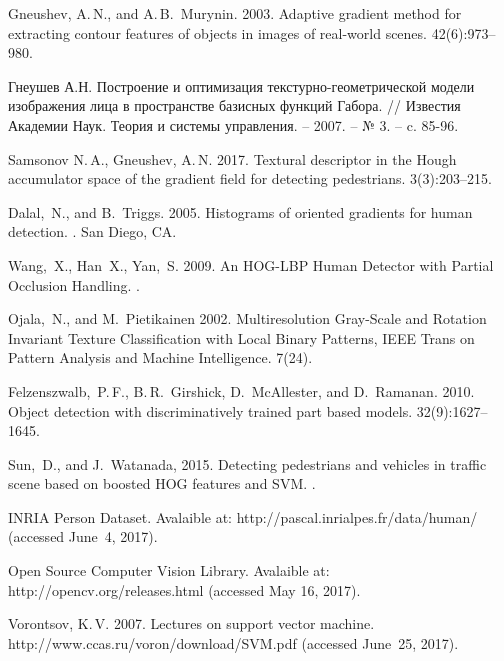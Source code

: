 \documentclass[12pt,twoside]{article}
\begin{document}
\begin{thebibliography}{99}
Gneushev, A.\,N., and A.\,B.~Murynin.	
2003. Adaptive gradient method for extracting contour features of
objects in images of real-world scenes.
 42(6):973--980.

Гнеушев А.Н. Построение и оптимизация текстурно-геометрической модели изображения лица в пространстве базисных функций Габора. // Известия Академии Наук. Теория и системы управления. – 2007. – № 3. – c. 85-96.

Samsonov N.\,A., Gneushev, A.\,N.	
2017. Textural descriptor in the Hough accumulator space of the gradient field for detecting pedestrians.
 3(3):203--215.

Dalal,~N., and B.~Triggs. 2005.
 Histograms of oriented gradients for
human detection. . San Diego, CA.

Wang,~X., Han~X., Yan,~S. 2009.
 An HOG-LBP Human Detector with Partial Occlusion Handling. .

Ojala,~N., and M.~Pietikainen 2002.
 Multiresolution Gray-Scale and Rotation Invariant Texture Classification with Local Binary Patterns, IEEE Trans on Pattern Analysis and Machine Intelligence.
 7(24).
 
	{Felzenszwalb,~P.\,F., B.\,R.~Girshick, D.~McAllester,
	and D.~Ramanan}. 2010.
	Object detection with discriminatively trained part based models.
 32(9):1627--1645.

	{Sun,~D., and J.~Watanada}, 2015.
	Detecting pedestrians and vehicles in traffic scene based on
	boosted HOG features and SVM.
.

	INRIA Person Dataset.
	Avalaible at: {\sf http://pascal.inrialpes.fr/data/human/}
	(accessed June~4, 2017).

	Open Source Computer Vision Library.
	Avalaible at: {\sf http://opencv.org/releases.html}
	(accessed May 16, 2017).
	
	Vorontsov, K.\,V. 2007. Lectures on support vector machine.
	{\sf http://www.ccas.ru/voron/download/\linebreak SVM.pdf}
	(accessed June~25, 2017).
	

\end{thebibliography}
\end{document}

